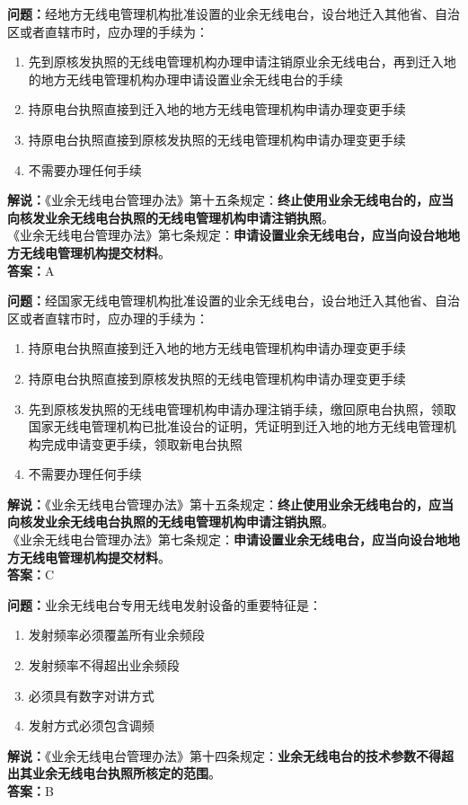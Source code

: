 \bigskip


\noindent\textbf{问题：}经地方无线电管理机构批准设置的业余无线电台，设台地迁入其他省、自治区或者直辖市时，应办理的手续为：
\begin{enumerate}[label=\Alph*), leftmargin=3em]
	\item 先到原核发执照的无线电管理机构办理申请注销原业余无线电台，再到迁入地的地方无线电管理机构办理申请设置业余无线电台的手续
	\item 持原电台执照直接到迁入地的地方无线电管理机构申请办理变更手续
	\item 持原电台执照直接到原核发执照的无线电管理机构申请办理变更手续
	\item 不需要办理任何手续
\end{enumerate}
\noindent\textbf{解说：}《业余无线电台管理办法》第十五条规定：\textbf{终止使用业余无线电台的，应当向核发业余无线电台执照的无线电管理机构申请注销执照}。\\
《业余无线电台管理办法》第七条规定：\textbf{申请设置业余无线电台，应当向设台地地方无线电管理机构提交材料}。\\\noindent\textbf{答案：}A%


\bigskip


\noindent\textbf{问题：}经国家无线电管理机构批准设置的业余无线电台，设台地迁入其他省、自治区或者直辖市时，应办理的手续为：
\begin{enumerate}[label=\Alph*), leftmargin=3em]
	\item 持原电台执照直接到迁入地的地方无线电管理机构申请办理变更手续
	\item 持原电台执照直接到原核发执照的无线电管理机构申请办理变更手续
	\item 先到原核发执照的无线电管理机构申请办理注销手续，缴回原电台执照，领取国家无线电管理机构已批准设台的证明，凭证明到迁入地的地方无线电管理机构完成申请变更手续，领取新电台执照
	\item 不需要办理任何手续
\end{enumerate}
\noindent\textbf{解说：}《业余无线电台管理办法》第十五条规定：\textbf{终止使用业余无线电台的，应当向核发业余无线电台执照的无线电管理机构申请注销执照}。\\
《业余无线电台管理办法》第七条规定：\textbf{申请设置业余无线电台，应当向设台地地方无线电管理机构提交材料}。\\\noindent\textbf{答案：}C%



\bigskip


\noindent\textbf{问题：}业余无线电台专用无线电发射设备的重要特征是：
\begin{enumerate}[label=\Alph*), leftmargin=3em]
	\item 发射频率必须覆盖所有业余频段
	\item 发射频率不得超出业余频段
	\item 必须具有数字对讲方式
	\item 发射方式必须包含调频
\end{enumerate}
\noindent\textbf{解说：}《业余无线电台管理办法》第十四条规定：\textbf{业余无线电台的技术参数不得超出其业余无线电台执照所核定的范围}。\\\noindent\textbf{答案：}B%



